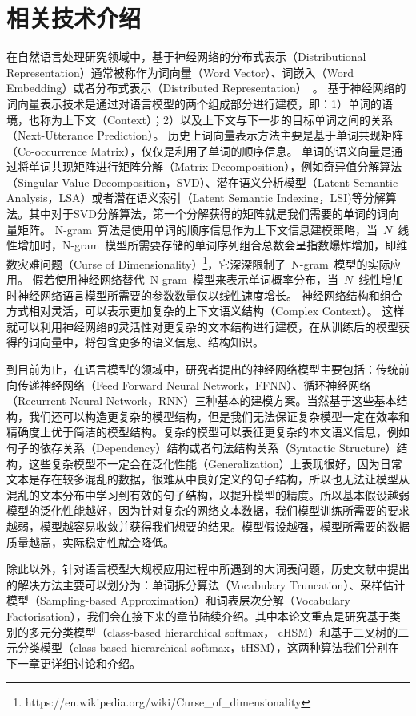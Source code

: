 \chapter{相关技术介绍}
在自然语言处理研究领域中，基于神经网络的分布式表示（Distributional Representation）通常被称作为词向量（Word Vector）、词嵌入（Word Embedding）或者分布式表示（Distributed Representation）~。
基于神经网络的词向量表示技术是通过对语言模型的两个组成部分进行建模，即：1）单词的语境，也称为上下文（Context）；2）以及上下文与下一步的目标单词之间的关系（Next-Utterance Prediction）。
历史上词向量表示方法主要是基于单词共现矩阵（Co-occurrence Matrix），仅仅是利用了单词的顺序信息。
单词的语义向量是通过将单词共现矩阵进行矩阵分解（Matrix Decomposition），例如奇异值分解算法（Singular Value Decomposition，SVD）、潜在语义分析模型（Latent Semantic Analysis，LSA）或者潜在语义索引（Latent Semantic Indexing，LSI)等分解算法。其中对于SVD分解算法，第一个分解获得的矩阵就是我们需要的单词的词向量矩阵。
N-gram~算法是使用单词的顺序信息作为上下文信息建模策略，当~$N$~线性增加时，N-gram~模型所需要存储的单词序列组合总数会呈指数爆炸增加，即维数灾难问题（Curse of Dimensionality）\footnote{https://en.wikipedia.org/wiki/Curse\_of\_dimensionality}，它深深限制了~N-gram~模型的实际应用。
假若使用神经网络替代~N-gram~模型来表示单词概率分布，当~$N$~线性增加时神经网络语言模型所需要的参数数量仅以线性速度增长。
神经网络结构和组合方式相对灵活，可以表示更加复杂的上下文语义结构（Complex Context）。
这样就可以利用神经网络的灵活性对更复杂的文本结构进行建模，在从训练后的模型获得的词向量中，将包含更多的语义信息、结构知识。

到目前为止，在语言模型的领域中，研究者提出的神经网络模型主要包括：传统前向传递神经网络（Feed Forward Neural Network，FFNN）、循环神经网络（Recurrent Neural Network，RNN）三种基本的建模方案。当然基于这些基本结构，我们还可以构造更复杂的模型结构，但是我们无法保证复杂模型一定在效率和精确度上优于简洁的模型结构。复杂的模型可以表征更复杂的本文语义信息，例如句子的依存关系（Dependency）结构或者句法结构关系（Syntactic Structure）结构，这些复杂模型不一定会在泛化性能（Generalization）上表现很好，因为日常文本是存在较多混乱的数据，很难从中良好定义的句子结构，所以也无法让模型从混乱的文本分布中学习到有效的句子结构，以提升模型的精度。所以基本假设越弱模型的泛化性能越好，因为针对复杂的网络文本数据，我们模型训练所需要的要求越弱，模型越容易收敛并获得我们想要的结果。模型假设越强，模型所需要的数据质量越高，实际稳定性就会降低。


除此以外，针对语言模型大规模应用过程中所遇到的大词表问题，历史文献中提出的解决方法主要可以划分为：单词拆分算法（Vocabulary Truncation）、采样估计模型（Sampling-based Approximation）和词表层次分解（Vocabulary Factorisation），我们会在接下来的章节陆续介绍。其中本论文重点是研究基于类别的多元分类模型（class-based hierarchical softmax， cHSM）和基于二叉树的二元分类模型（class-based hierarchical softmax，tHSM），这两种算法我们分别在下一章更详细讨论和介绍。

